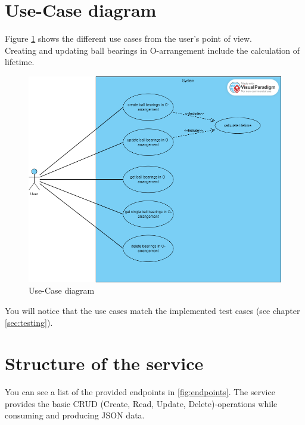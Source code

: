     \section{Use-Case diagram}
        Figure \ref{fig:use_case} shows the different use cases from the user's point of view. \\
        Creating and updating ball bearings in O-arrangement include the calculation of lifetime. 
        \begin{figure}[h]
            \centering
            \includegraphics[scale=0.5]{images/use_case_diagram.png}
            \caption{Use-Case diagram}
            \label{fig:use_case}
        \end{figure}
        
        You will notice that the use cases match the implemented test cases (see chapter \ref{sec:testing}).
    
    \section{Structure of the service}
        You can see a list of the provided endpoints in \ref{fig:endpoints}. The service provides the basic CRUD (Create, Read, Update, Delete)-operations while consuming and producing JSON data. 

